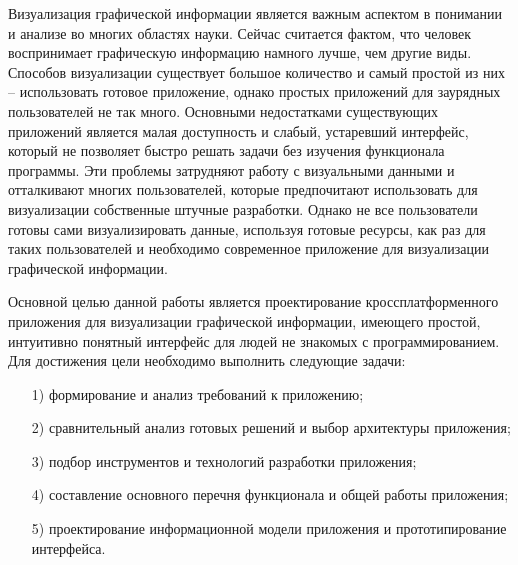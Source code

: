 \intro
Визуализация графической информации является важным аспектом в понимании и анализе во многих областях науки. Сейчас считается фактом, что человек воспринимает графическую информацию намного лучше, чем другие виды. Способов визуализации существует большое количество и самый простой из них --  использовать готовое приложение, однако простых приложений для заурядных пользователей не так много. Основными недостатками существующих приложений является малая доступность и слабый, устаревший интерфейс, который не позволяет быстро решать задачи без изучения функционала программы. Эти проблемы затрудняют работу с визуальными данными и отталкивают многих пользователей, которые предпочитают использовать для визуализации собственные штучные разработки. Однако не все пользователи готовы сами визуализировать данные, используя готовые ресурсы, как раз для таких пользователей и необходимо современное приложение для визуализации графической информации.

Основной целью данной работы является проектирование кроссплатформенного приложения для визуализации графической информации, имеющего простой, интуитивно понятный интерфейс для людей не знакомых с программированием.
Для достижения цели необходимо выполнить следующие задачи:
\begin{enumerate}
    \item [1)] формирование и анализ требований к приложению;
    \item [2)] сравнительный анализ готовых решений и выбор архитектуры приложения;
    \item [3)] подбор инструментов и технологий разработки приложения;
    \item [4)] составление основного перечня функционала и общей работы приложения;
    \item [5)] проектирование информационной модели приложения и прототипирование интерфейса.
\end{enumerate}



